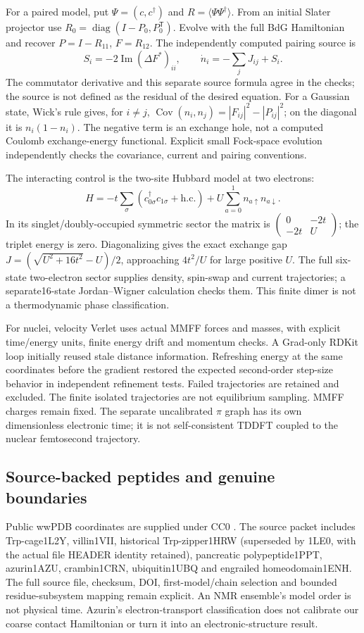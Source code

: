 For a paired model, put $\Psi=(c,c^\dagger)$ and
$R=\langle\Psi\Psi^\dagger\rangle$. From an initial Slater projector use
$R_0=\operatorname{diag}(I-P_0,P_0^{\mathsf T})$. Evolve with the full BdG
Hamiltonian and recover $P=I-R_{11}$, $F=R_{12}$.
The independently computed pairing source is
\[
 S_i=-2\operatorname{Im}(\Delta F^*)_{ii},\qquad
 \dot n_i=-\sum_jJ_{ij}+S_i.
\]
The commutator derivative and this separate source formula agree in the
checks; the source is not defined as the residual of the desired equation.
For a Gaussian state, Wick's rule gives, for $i\ne j$,
$\operatorname{Cov}(n_i,n_j)=|F_{ij}|^2-|P_{ij}|^2$; on the diagonal it is
$n_i(1-n_i)$. The negative term is an exchange hole, not a computed Coulomb
exchange-energy functional. Explicit small Fock-space evolution independently
checks the covariance, current and pairing conventions.

The interacting control is the two-site Hubbard model at two electrons:
\[
 H=-t\sum_\sigma(c_{0\sigma}^\dagger c_{1\sigma}+\mathrm{h.c.})
   +U\sum_{a=0}^1n_{a\uparrow}n_{a\downarrow}.
\]
In its singlet/doubly-occupied symmetric sector the matrix is
$\left(\begin{smallmatrix}0&-2t\\-2t&U\end{smallmatrix}\right)$;
the triplet energy is zero. Diagonalizing gives the exact exchange gap
$J=(\sqrt{U^2+16t^2}-U)/2$, approaching $4t^2/U$ for large positive $U$.
The full six-state two-electron sector supplies density, spin-swap and current
trajectories; a separate16-state Jordan--Wigner calculation checks them.
This finite dimer is not a thermodynamic phase classification.

For nuclei, velocity Verlet uses actual MMFF forces and masses, with explicit
time/energy units, finite energy drift and momentum checks. A Grad-only RDKit
loop initially reused stale distance information. Refreshing energy at the same
coordinates before the gradient restored the expected second-order step-size
behavior in independent refinement tests. Failed trajectories are retained and
excluded. The finite isolated trajectories are not equilibrium sampling.
MMFF charges remain fixed. The separate uncalibrated $\pi$ graph has its own
dimensionless electronic time; it is not self-consistent TDDFT coupled to the
nuclear femtosecond trajectory.

\subsection{Source-backed peptides and genuine boundaries}
Public wwPDB coordinates are supplied under CC0 \cite{DSPDB}. The source packet
includes Trp-cage1L2Y, villin1VII, historical Trp-zipper1HRW (superseded by
1LE0, with the actual file HEADER identity retained), pancreatic polypeptide1PPT,
azurin1AZU, crambin1CRN, ubiquitin1UBQ and engrailed homeodomain1ENH.
The full source file, checksum, DOI, first-model/chain selection and bounded
residue-subsystem mapping remain explicit. An NMR ensemble's model order is
not physical time. Azurin's electron-transport classification does not calibrate
our coarse contact Hamiltonian or turn it into an electronic-structure result.

